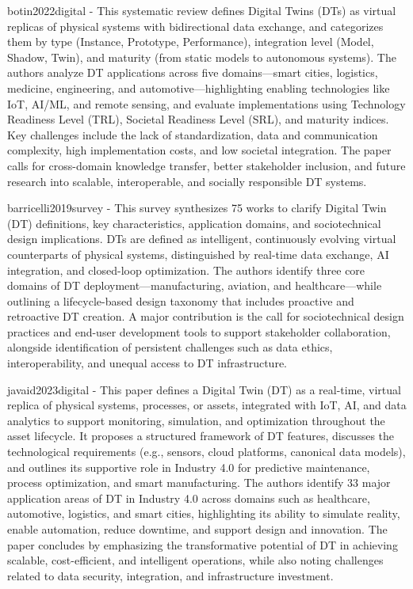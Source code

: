botin2022digital - This systematic review defines Digital Twins (DTs) as virtual replicas of physical systems with bidirectional data exchange, and categorizes them by type (Instance, Prototype, Performance), integration level (Model, Shadow, Twin), and maturity (from static models to autonomous systems). The authors analyze DT applications across five domains—smart cities, logistics, medicine, engineering, and automotive—highlighting enabling technologies like IoT, AI/ML, and remote sensing, and evaluate implementations using Technology Readiness Level (TRL), Societal Readiness Level (SRL), and maturity indices. Key challenges include the lack of standardization, data and communication complexity, high implementation costs, and low societal integration. The paper calls for cross-domain knowledge transfer, better stakeholder inclusion, and future research into scalable, interoperable, and socially responsible DT systems.

barricelli2019survey - This survey synthesizes 75 works to clarify Digital Twin (DT) definitions, key characteristics, application domains, and sociotechnical design implications. DTs are defined as intelligent, continuously evolving virtual counterparts of physical systems, distinguished by real-time data exchange, AI integration, and closed-loop optimization. The authors identify three core domains of DT deployment—manufacturing, aviation, and healthcare—while outlining a lifecycle-based design taxonomy that includes proactive and retroactive DT creation. A major contribution is the call for sociotechnical design practices and end-user development tools to support stakeholder collaboration, alongside identification of persistent challenges such as data ethics, interoperability, and unequal access to DT infrastructure.

javaid2023digital - This paper defines a Digital Twin (DT) as a real-time, virtual replica of physical systems, processes, or assets, integrated with IoT, AI, and data analytics to support monitoring, simulation, and optimization throughout the asset lifecycle. It proposes a structured framework of DT features, discusses the technological requirements (e.g., sensors, cloud platforms, canonical data models), and outlines its supportive role in Industry 4.0 for predictive maintenance, process optimization, and smart manufacturing. The authors identify 33 major application areas of DT in Industry 4.0 across domains such as healthcare, automotive, logistics, and smart cities, highlighting its ability to simulate reality, enable automation, reduce downtime, and support design and innovation. The paper concludes by emphasizing the transformative potential of DT in achieving scalable, cost-efficient, and intelligent operations, while also noting challenges related to data security, integration, and infrastructure investment.


